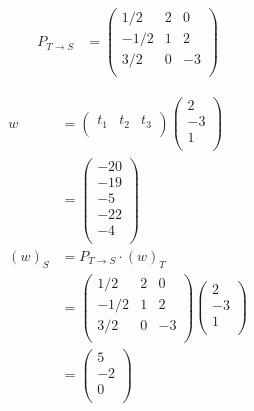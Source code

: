 \documentclass[12pt]{article}
\newenvironment{problem}[2][Problem]{\begin{trivlist}
\item[\hskip \labelsep {\bfseries #1}\hskip \labelsep {\bfseries #2.}]}{\end{trivlist}}
\begin{document}
\begin{problem}{1.iv}
\end{problem}
\begin{align*}
P_{T \to S}
&=
\left( \begin{array}{ccc}
1/2 & 2 & 0\\ 
-1/2 & 1 & 2\\
3/2 & 0 & -3\\ 
\end{array} \right)
\end{align*}
\filbreak

\begin{problem}{1.v}
\end{problem}
\begin{align*}
w &= \left( \begin{array}{ccc}
t_1 & t_2 & t_3\\ 
\end{array} \right)
\left( \begin{array}{c}
2\\
-3\\
1\\ 
\end{array} \right)\\
&= 
\left( \begin{array}{c}
-20\\
-19\\
-5\\
-22\\
-4\\ 
\end{array} \right)\\
(w)_S &= P_{T \to S} \cdot (w)_T\\
&=
\left( \begin{array}{ccc}
1/2 & 2 & 0\\ 
-1/2 & 1 & 2\\
3/2 & 0 & -3\\ 
\end{array} \right)
\left( \begin{array}{c}
2\\
-3\\
1\\ 
\end{array} \right)\\
&=
\left( \begin{array}{c}
5\\
-2\\
0\\ 
\end{array} \right)
\end{align*}
\filbreak
\end{document}
